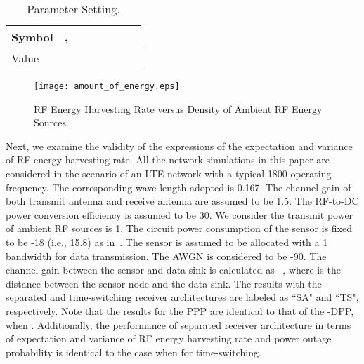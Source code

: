 \documentclass[12pt,draftclsnofoot,onecolumn]{IEEEtran}
\begin{document}
\begin{table}
\centering
\caption{\footnotesize Parameter Setting.} \label{parameter_setting}
\begin{tabular}{|l|l|l|l|l|l|l|l|} 
\hline
Symbol & ,  &   &  &  &  &  &  \\ 
\hline
Value  &  &   &   &   &   &  &  \\
\hline              
\end{tabular}
\end{table}

\begin{figure}
\centering
\texttt{[image: amount\_of\_energy.eps]}
\caption{RF Energy Harvesting Rate versus Density of Ambient RF Energy Sources. } \label{fig:amount_of_energy}
\end{figure}


Next, we examine the validity of the expressions of the expectation and variance of RF energy harvesting rate. All the network simulations in this paper are considered in the scenario of an LTE network with a typical 1800 operating frequency. The corresponding wave length adopted is 0.167. 
The channel gain of both transmit antenna and receive antenna are assumed to be 1.5. The RF-to-DC power conversion efficiency is assumed to be 30. We consider the transmit power of ambient RF sources is 1. The circuit power consumption of the sensor is fixed to be -18 (i.e., 15.8) as in~\cite{N.2013Parks}.
The sensor is assumed to be allocated with a 1 bandwidth for data transmission. The AWGN is considered to be -90.
The channel gain between the sensor and data sink is calculated as ~\cite{2014X.Lu}, where  is the distance between the sensor node and the data sink. The results with the separated and time-switching receiver architectures are labeled as ``SA" and ``TS", respectively. Note that the results for the PPP are identical to that of the -DPP, when . Additionally, the performance of separated receiver architecture in terms of expectation and variance of RF energy harvesting rate and power outage probability is identical to the case when  for time-switching. 
\end{document}
